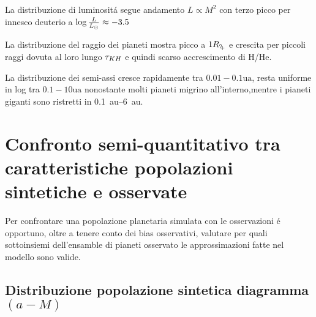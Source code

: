 \begin{workout}
La distribuzione di luminosit\'a segue andamento $L\propto M^2$ con terzo picco per innesco deuterio a $\log{\frac{L}{L_{\odot}}}\approx-3.5$
\end{workout}

La distribuzione del raggio dei pianeti mostra picco a $1\rjupiter$ e crescita per piccoli raggi dovuta al loro lungo $\tau_{KH}{}$ e quindi scarso accrescimento di H/He.

La distribuzione dei semi-assi cresce rapidamente tra $0.01-0.1\si{\astronomicalunit}$, resta uniforme in log tra $0.1-10\si{\astronomicalunit}$ nonostante molti pianeti migrino all'interno,mentre i pianeti giganti sono ristretti in \SIrange{0.1}{6}{\astronomicalunit}.

{\let\clearpage\relax\let\cleardoublepage\relax
\chapter{Confronto semi-quantitativo tra caratteristiche popolazioni sintetiche e osservate}
}

Per confrontare una popolazione planetaria simulata con le osservazioni \'e opportuno, oltre a tenere conto dei bias osservativi, valutare per quali sottoinsiemi dell'ensamble di pianeti osservato le approssimazioni fatte nel modello sono valide.

\section{Distribuzione popolazione sintetica diagramma $(a-M)$}

